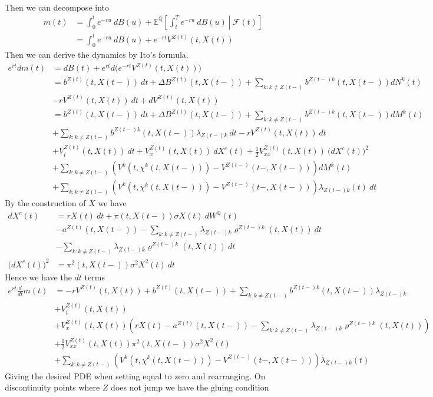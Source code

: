 \documentclass[a4paper,10pt,openany]{book}
\begin{document}
Then we can decompose into
\begin{align*}
m(t)&=\int_0^te^{-ru}\ dB(u)+\mathbb E^{\mathbb Q}\left[\left. \int_t^Te^{-ru}\ dB(u)\ \right\vert\ \mathcal F(t)\right]\\
&=\int_0^te^{-ru}\ dB(u)+e^{-rt}V^{Z(t)}(t,X(t))
\end{align*}
Then we can derive the dynamics by Ito's formula.
\begin{align*}
e^{rt}dm(t)&=dB(t)+e^{rt}d\Big(e^{-rt}V^{Z(t)}(t,X(t))\Big)\\
&=b^{Z(t)}(t,X(t-))\ dt+\Delta B^{Z(t)}(t,X(t-))+\sum_{k:k\ne Z(t-)}b^{Z(t-)k}(t,X(t-))dN^k(t)\\
&-rV^{Z(t)}(t,X(t))\ dt+dV^{Z(t)}(t,X(t))\\
&=b^{Z(t)}(t,X(t-))\ dt+\Delta B^{Z(t)}(t,X(t-))+\sum_{k:k\ne Z(t-)}b^{Z(t-)k}(t,X(t-))dM^k(t)\\
&+\sum_{k:k\ne Z(t-)}b^{Z(t-)k}(t,X(t-))\lambda_{Z(t-)k}\ dt-rV^{Z(t)}(t,X(t))\ dt\\
&+V_t^{Z(t)}(t,X(t))\ dt+V_x^{Z(t)}(t,X(t))\ dX^c(t)+\frac{1}{2}V_{xx}^{Z(t)}(t,X(t))\ \big(dX^c(t)\big)^2\\
&+\sum_{k:k\ne Z(t-)}\left(V^{k}(t,\chi^k(t,X(t-)))-V^{Z(t-)}(t-,X(t-))\right)dM^k(t)\\
&+\sum_{k:k\ne Z(t-)}\left(V^{k}(t,\chi^k(t,X(t-)))-V^{Z(t-)}(t-,X(t-))\right)\lambda_{Z(t-)k}(t)\ dt
\end{align*}
By the construction of \(X\) we have
\begin{align*}
dX^c(t)&=rX(t)\ dt+\pi(t,X(t-))\sigma X(t)\ dW^\mathbb Q(t)\\
&-a^{Z(t)}(t,X(t-))-\sum_{k:k\ne Z(t-)}\lambda_{Z(t-)k}\varrho^{Z(t-)k}(t,X(t))\ dt\\
&-\sum_{k:k\ne Z(t-)}\lambda_{Z(t-)k}\varrho^{Z(t-)k}(t,X(t))\ dt\\
\big(dX^c(t)\big)^2&=\pi^2(t,X(t-))\sigma^2 X^2(t)\ dt
\end{align*}
Hence we have the \(dt\) terms
\begin{align*}
e^{rt}\frac{d}{dt}m(t)&=-rV^{Z(t)}(t,X(t))+b^{Z(t)}(t,X(t-))+\sum_{k:k\ne Z(t-)}b^{Z(t-)k}(t,X(t-))\lambda_{Z(t-)k}\\
&+V_t^{Z(t)}(t,X(t))\\
&+V_x^{Z(t)}(t,X(t))\left(rX(t)-a^{Z(t)}(t,X(t-))-\sum_{k:k\ne Z(t-)}\lambda_{Z(t-)k}\varrho^{Z(t-)k}(t,X(t))\right)\\
&+\frac{1}{2}V_{xx}^{Z(t)}(t,X(t))\pi^2(t,X(t-))\sigma^2 X^2(t)\\
&+\sum_{k:k\ne Z(t-)}\left(V^{k}(t,\chi^k(t,X(t-)))-V^{Z(t-)}(t-,X(t-))\right)\lambda_{Z(t-)k}(t)
\end{align*}
Giving the desired PDE when setting equal to zero and rearranging. On discontinuity points where \(Z\) does not jump we have the gluing condition
\end{document}
